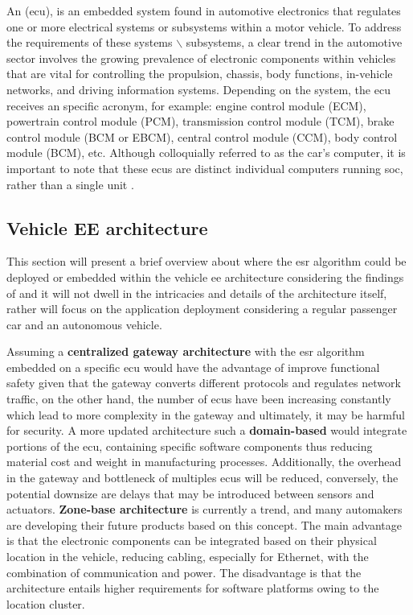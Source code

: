 An  (\gls{ecu}), is an embedded system found in automotive electronics that regulates one or more electrical systems or subsystems within a motor vehicle. To address the requirements of these systems $\backslash$ subsystems, a clear trend in the automotive sector involves the growing prevalence of electronic components within vehicles that are vital for controlling the propulsion, chassis, body functions, in-vehicle networks, and driving information systems. Depending on the system, the \gls{ecu} receives an specific acronym, for example: engine control module (ECM), powertrain control module (PCM), transmission control module (TCM), brake control module (BCM or EBCM), central control module (CCM), body control module (BCM), etc. Although colloquially referred to as the car's computer, it is important to note that these \gls{ecu}s are distinct individual computers running \gls{soc}, rather than a single unit \cite{Aptiv2020}.


\subsection{Vehicle EE architecture}
\label{subsec:ECU_common_units_in_market}

This section will present a brief overview about where the \gls{esr} algorithm could be deployed or embedded within the vehicle \gls{ee} architecture considering the findings of \textcite{Zhu2021} and it will not dwell in the intricacies and details of the architecture itself, rather will focus on the application deployment considering a regular passenger car and an autonomous vehicle.

Assuming a \textbf{centralized gateway architecture} with the \gls{esr} algorithm embedded on a specific \gls{ecu} would have the advantage of improve functional safety given that the gateway converts different protocols and regulates network traffic, on the other hand,  the number of \gls{ecu}s have been increasing constantly which lead to more complexity in the gateway and ultimately, it may be harmful for security. A more updated architecture such a \textbf{domain-based} would integrate portions of the \gls{ecu}, containing specific software components thus reducing material cost and weight in manufacturing processes. Additionally, the overhead in the gateway and bottleneck of multiples \gls{ecu}s will be reduced, conversely, the potential downsize are delays that may be introduced between sensors and actuators. \textbf{Zone-base architecture} is currently a trend, and many automakers are developing their future products based on this concept. The main advantage is that the electronic components can be integrated based on their physical location in the vehicle, reducing cabling, especially for Ethernet, with the combination of communication and power. The disadvantage is that the architecture entails higher requirements for software platforms owing to the location cluster.



